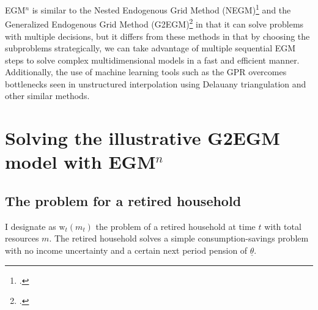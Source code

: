 \documentclass{article}
\newcommand{\tShkEmp}{\theta}
\newcommand{\mRat}{m}
\newcommand{\wFunc}{\mathrm{w}}
\begin{document}
EGM$^n$ is similar to the Nested Endogenous Grid Method (NEGM)\footnote{\citet{Druedahl2021}.} and the Generalized Endogenous Grid Method (G2EGM)\footnote{\citet{Druedahl2017}.} in that it can solve problems with multiple decisions, but it differs from these methods in that by choosing the subproblems strategically, we can take advantage of multiple sequential EGM steps to solve complex multidimensional models in a fast and efficient manner. Additionally, the use of machine learning tools such as the GPR overcomes bottlenecks seen in unstructured interpolation using Delauany triangulation and other similar methods.






\section{Solving the illustrative G2EGM model with EGM$^n$}\label{appendix}

\subsection{The problem for a retired household}\label{The problem for a retired household}

I designate as $\wFunc_{t}(\mRat_{t})$ the problem of a retired household at time $t$ with total resources $\mRat$. The retired household solves a simple consumption-savings problem with no income uncertainty and a certain next period pension of $\underline{\tShkEmp}$.
\end{document}
